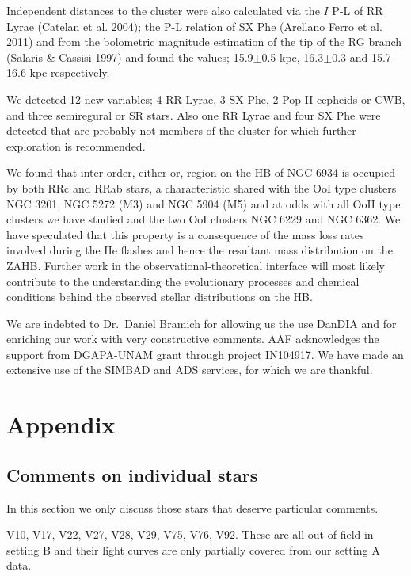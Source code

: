 \documentclass[journal]{rmaa}
\newcommand{\1}{\'{\i}}
\begin{document}
Independent distances to the cluster were also calculated via the $I$ P-L of RR Lyrae
(Catelan et al. 2004); the P-L relation of SX Phe (Arellano Ferro et al. 2011) and
from the bolometric magnitude estimation of the tip of the RG branch (Salaris \&
Cassisi 1997) and found the values;  15.9$\pm$0.5 kpc, 16.3$\pm$0.3 and 15.7-16.6
kpc
respectively.

We detected 12 new variables; 4 RR Lyrae, 3 SX Phe, 2 Pop II cepheids or CWB, and
three semiregural or SR stars. Also one RR Lyrae and four SX Phe were detected that
are probably not members
of the cluster for which further exploration is recommended.

We found that inter-order, either-or, region on the HB of NGC 6934 is occupied by both
RRc and RRab stars,
a characteristic shared with the OoI type clusters NGC 3201, NGC 5272 (M3) and NGC
5904 (M5) and at odds with all OoII type clusters we have studied and the two OoI
clusters
NGC 6229 and NGC 6362. We have speculated that this property is a consequence of the
mass loss rates involved during the He flashes and hence the resultant mass
distribution on the
ZAHB. Further work in the observational-theoretical interface will most likely
contribute to the understanding the evolutionary processes and chemical conditions
behind the observed stellar distributions on the HB.

\vskip 2.0cm

\noindent
We are indebted to Dr.~Daniel Bramich for allowing us the use DanDIA and
for enriching our work with very constructive comments.
AAF acknowledges the support from DGAPA-UNAM grant through project IN104917.
We have made an extensive use of the SIMBAD and ADS services, for which we are
thankful.

\appendix

\section{Appendix}
\label{Appendix}

\subsection{Comments on individual stars}

In this section we only discuss those stars that deserve particular comments.

V10, V17, V22, V27, V28, V29, V75, V76, V92. These are all out of field in setting B
and
their light curves are only partially covered from our setting A data.
\end{document}
